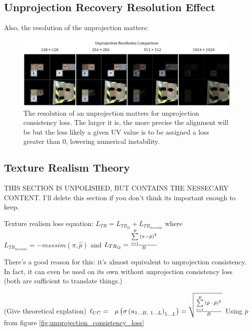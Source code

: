 \documentclass{article}
\begin{document}
	\subsection*{Unprojection Recovery Resolution Effect}

		Also, the resolution of the unprojection matters:



		\begin{figure}[H]
			\begin{center}
				\includegraphics[width=400pt]{../images/unprojection_resolution_comparison.pdf}
			\end{center}
			\caption{
				The resolution of an unprojection matters for unprojection consistency loss. The larger it is, the more precise the alignment will be but the less likely a given UV value is to be assigned a loss greater than 0, lowering numerical instability.
			}
			\label{fig:unprojection_resolution_comparison}
		\end{figure}

	\subsection*{Texture Realism Theory}
		\label{sec:texture_realism_theory}


		THIS SECTION IS UNPOLISHED, BUT CONTAINS  THE NESSECARY CONTENT.
		I'll delete this section if you don't think its important enough to keep.

		Texture realism loss equation:
		$L_{TR}=L_{TR_{l2}}+L_{TR_{msssim}}$
		where 
		$L_{TR_{msssim}} = -msssim(\pi,\hat{p})$ and
		$L_{TR_{l2}} = \frac{
			\sum\limits_{i=1}^B {
			\left( \pi-\hat{p}  \right)^2
				} 
		}
		{B}$

		There's a good reason for this: it's almost equivalent to unprojection consistency.
		In fact, it can even be used on its own without unprojection consistency loss (both are sufficient to translate things.)

		(Give theoretical explation)
		$
		\ell_{UC} = 
		\
		\
		\mu\left(\sigma\left(u_{1\dots B,\ 1\dots L}\right)_{1 \dots L}\right) = 
		\sqrt{
		\frac{
			\sum\limits_{i=1}^B {
				\left( \hat{p}-\bar{p}  \right)^2
				} 
			}
			{B}
		}
		$
		Using $\bar{p}$ from figure \ref{fig:unprojection_consistency_loss}
\end{document}
